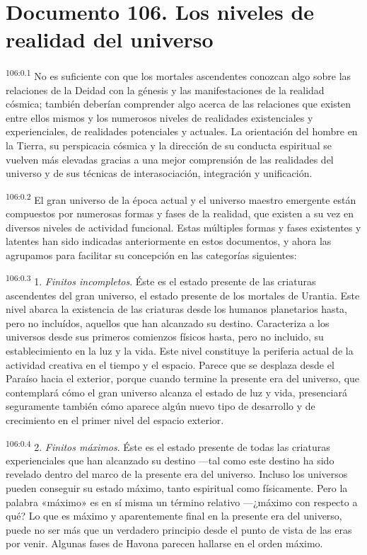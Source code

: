 \chapter{Documento 106. Los niveles de realidad del universo}
\par
\textsuperscript{106:0.1} No es suficiente con que los mortales ascendentes conozcan algo sobre las relaciones de la Deidad con la génesis y las manifestaciones de la realidad cósmica; también deberían comprender algo acerca de las relaciones que existen entre ellos mismos y los numerosos niveles de realidades existenciales y experienciales, de realidades potenciales y actuales. La orientación del hombre en la Tierra, su perspicacia cósmica y la dirección de su conducta espiritual se vuelven más elevadas gracias a una mejor comprensión de las realidades del universo y de sus técnicas de interasociación, integración y unificación.

\par
\textsuperscript{106:0.2} El gran universo de la época actual y el universo maestro emergente están compuestos por numerosas formas y fases de la realidad, que existen a su vez en diversos niveles de actividad funcional. Estas múltiples formas y fases existentes y latentes han sido indicadas anteriormente en estos documentos, y ahora las agrupamos para facilitar su concepción en las categorías siguientes:

\par
\textsuperscript{106:0.3} 1. \textit{Finitos incompletos}. Éste es el estado presente de las criaturas ascendentes del gran universo, el estado presente de los mortales de Urantia. Este nivel abarca la existencia de las criaturas desde los humanos planetarios hasta, pero no incluídos, aquellos que han alcanzado su destino. Caracteriza a los universos desde sus primeros comienzos físicos hasta, pero no incluido, su establecimiento en la luz y la vida. Este nivel constituye la periferia actual de la actividad creativa en el tiempo y el espacio. Parece que se desplaza desde el Paraíso hacia el exterior, porque cuando termine la presente era del universo, que contemplará cómo el gran universo alcanza el estado de luz y vida, presenciará seguramente también cómo aparece algún nuevo tipo de desarrollo y de crecimiento en el primer nivel del espacio exterior.

\par
\textsuperscript{106:0.4} 2. \textit{Finitos máximos}. Éste es el estado presente de todas las criaturas experienciales que han alcanzado su destino ---tal como este destino ha sido revelado dentro del marco de la presente era del universo. Incluso los universos pueden conseguir su estado máximo, tanto espiritual como físicamente. Pero la palabra «máximo» es en sí misma un término relativo ---¿máximo con respecto a qué? Lo que es máximo y aparentemente final en la presente era del universo, puede no ser más que un verdadero principio desde el punto de vista de las eras por venir. Algunas fases de Havona parecen hallarse en el orden máximo.

